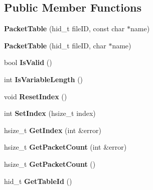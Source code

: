 \subsection*{Public Member Functions}
\begin{DoxyCompactItemize}
\item 
\mbox{\label{class_packet_table_adc377ae43754400a8baa8f63c43764e5}} 
{\bfseries Packet\+Table} (hid\+\_\+t file\+ID, const char $\ast$name)
\item 
\mbox{\label{class_packet_table_a4f86a975d8eeda57128a923b8e4392d8}} 
{\bfseries Packet\+Table} (hid\+\_\+t file\+ID, char $\ast$name)
\item 
\mbox{\label{class_packet_table_acc248d693d8857892ca0c5c1054fe59a}} 
bool {\bfseries Is\+Valid} ()
\item 
\mbox{\label{class_packet_table_a2b0c4db26b9da07b9c4995a310156528}} 
int {\bfseries Is\+Variable\+Length} ()
\item 
\mbox{\label{class_packet_table_ac61620fe96a07c9808c43e4345367cb4}} 
void {\bfseries Reset\+Index} ()
\item 
\mbox{\label{class_packet_table_a4a9440007ef8ac295e5ab63c3a36a70c}} 
int {\bfseries Set\+Index} (hsize\+\_\+t index)
\item 
\mbox{\label{class_packet_table_a98988d2fa8498743bf0776d148ebe783}} 
hsize\+\_\+t {\bfseries Get\+Index} (int \&error)
\item 
\mbox{\label{class_packet_table_a190ab7bcbdbe5829499261e1b0810550}} 
hsize\+\_\+t {\bfseries Get\+Packet\+Count} (int \&error)
\item 
\mbox{\label{class_packet_table_a8a98aeb406cefba65c9dd7d3992f1c1e}} 
hsize\+\_\+t {\bfseries Get\+Packet\+Count} ()
\item 
\mbox{\label{class_packet_table_aa394753fa243b46bcb7281b7db17ea85}} 
hid\+\_\+t {\bfseries Get\+Table\+Id} ()
\item 

\end{DoxyCompactItemize}
